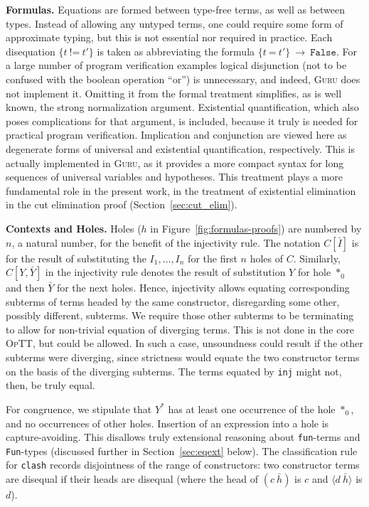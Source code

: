 \documentclass{fundam}
\newcommand{\optt}{\textsc{OpTT}}
\newcommand{\Eq}[0]{\texttt{=}}
\newcommand{\Neq}[0]{\texttt{!=}}
\begin{document}
\textbf{Formulas.} Equations are formed between type-free terms, as
well as between types.  Instead of allowing any untyped terms, one
could require some form of approximate typing, but this is not
essential nor required in practice.  Each disequation $\{ t\ \Neq\
t'\}$ is taken as abbreviating the formula $\{ t\ \Eq\ t'\}\ \to\
\texttt{False}$.  For a large number of program verification examples
logical disjunction (not to be confused with the boolean operation
``or'') is unnecessary, and indeed, \textsc{Guru} does not implement
it.  Omitting it from the formal treatment simplifies, as is well
known, the strong normalization argument.  Existential quantification,
which also poses complications for that argument, is included, because
it truly is needed for practical program verification.  Implication
and conjunction are viewed here as degenerate forms of universal and
existential quantification, respectively.  This is actually
implemented in \textsc{Guru}, as it provides a more compact syntax for
long sequences of universal variables and hypotheses.  This treatment
plays a more fundamental role in the present work, in the treatment of
existential elimination in the cut elimination proof
(Section~\ref{sec:cut_elim}).

\textbf{Contexts and Holes.}  Holes ($h$ in
Figure~\ref{fig:formulas-proofs}) are numbered by $n$, a natural
number, for the benefit of the injectivity rule.  The notation
$C[\bar{I}]$ is for the result of substituting the $I_1,\ldots,I_n$
for the first $n$ holes of $C$.  Similarly, $C[Y,\bar{Y}]$ in the
injectivity rule denotes the result of substitution $Y$ for hole $*_0$
and then $\bar{Y}$ for the next holes.  Hence, injectivity allows
equating corresponding subterms of terms headed by the same
constructor, disregarding some other, possibly different, subterms.
We require those other subterms to be terminating to allow for
non-trivial equation of diverging terms.  This is not done in the core
\optt, but could be allowed.  In such a case, unsoundness could result
if the other subterms were diverging, since strictness would equate
the two constructor terms on the basis of the diverging subterms.  The
terms equated by \texttt{inj} might not, then, be truly equal.

For congruence, we stipulate that $Y^*$ has at least one occurrence of
the hole $*_0$, and no occurrences of other holes.  Insertion of an
expression into a hole is capture-avoiding.  This disallows truly
extensional reasoning about \texttt{fun}-terms and \texttt{Fun}-types
(discussed further in Section~\ref{sec:eqext} below).  The
classification rule for \texttt{clash} records disjointness of the
range of constructors: two constructor terms are disequal if their
heads are disequal (where the head of $(c\ \bar{h})$ is $c$ and
$\langle d\ \bar{h}\rangle$ is $d$).
\end{document}

